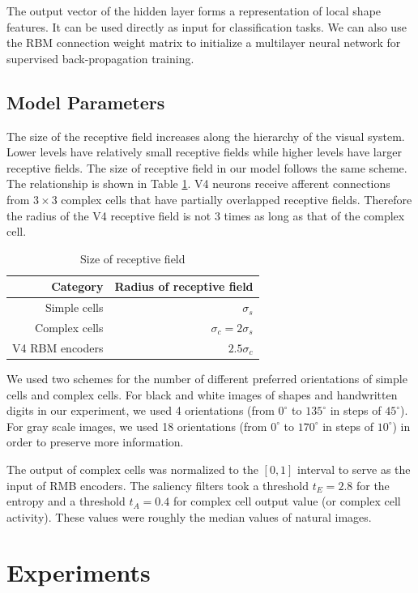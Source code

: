 \documentclass[conference]{IEEEtran}
\begin{document}
The output vector of the hidden layer forms a representation of local shape features.
It can be used directly as input for classification tasks.
We can also use the RBM connection weight matrix to initialize a multilayer neural network
for supervised back-propagation training.

\subsection{Model Parameters}

The size of the receptive field increases along the hierarchy of the visual system.
Lower levels have relatively small receptive fields while higher levels have larger receptive fields.
The size of receptive field in our model follows the same scheme.
The relationship is shown in Table \ref{tab:1}.
V4 neurons receive afferent connections from $3\times3$ complex cells
that have partially overlapped receptive fields.
Therefore the radius of the V4 receptive field is not 3 times as long as that of the complex cell.

\begin{table}[h]
\caption{Size of receptive field}
\centering
\begin{tabular}{rr}
\toprule
Category & Radius of receptive field \\
\midrule
Simple cells & $\sigma_s$ \\
Complex cells & $\sigma_c = 2\sigma_s$ \\
V4 RBM encoders & $2.5\sigma_c$\\
\bottomrule
\end{tabular}
\label{tab:1}
\end{table}

We used two schemes for the number of different preferred orientations of simple cells and complex cells.
For black and white images of shapes and handwritten digits in our experiment,
we used 4 orientations (from $0^\circ$ to $135^\circ$ in steps of $45^\circ$).
For gray scale images, we used 18 orientations (from $0^\circ$ to $170^\circ$ in steps of $10^\circ$)
in order to preserve more information.

The output of complex cells was normalized to the $[0,1]$ interval
to serve as the input of RMB encoders.
The saliency filters took a threshold $t_E=2.8$ for the entropy
and a threshold $t_A=0.4$ for complex cell output value (or complex cell activity).
These values were roughly the median values of natural images.

\section{Experiments}
\label{sec:4}
\end{document}
